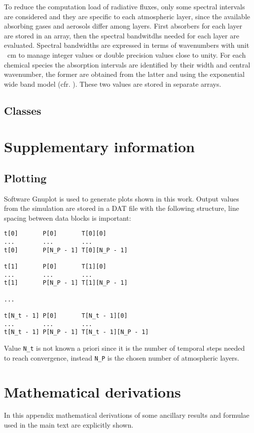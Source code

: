 \documentclass[a4paper,10pt,draft,twocolumn]{article}
\begin{document}
To reduce the computation load of radiative fluxes, only some spectral intervals are considered and they are specific to each atmospheric layer, since the available absorbing gases and aerosols differ among layers. First absorbers for each layer are stored in an array, then the spectral bandwitdhs needed for each layer are evaluated. Spectral bandwidths are expressed in terms of wavenumbers with unit \unit{\per\centi\metre} to manage integer values or double precision values close to unity. For each chemical species the absorption intervals are identified by their width and central wavenumber, the former are obtained from the latter and using the exponential wide band model (cfr. \cite[360]{Modest}). These two values are stored in separate arrays.

\subsection{Classes}

\section{Supplementary information}

\subsection{Plotting}
\label{sec:Plotting}
Software Gnuplot is used to generate plots shown in this work. Output values from the simulation are stored in a DAT file with the following structure, line spacing between data blocks is important:
\begin{verbatim}
t[0]       P[0]       T[0][0]
...        ...        ...
t[0]       P[N_P - 1] T[0][N_P - 1]

t[1]       P[0]       T[1][0]
...        ...        ...
t[1]       P[N_P - 1] T[1][N_P - 1]

...

t[N_t - 1] P[0]       T[N_t - 1][0]
...        ...        ...
t[N_t - 1] P[N_P - 1] T[N_t - 1][N_P - 1]
\end{verbatim}
Value \verb|N_t| is not known a priori since it is the number of temporal steps needed to reach convergence, instead \verb|N_P| is the chosen number of atmospheric layers.

\section{Mathematical derivations}
In this appendix mathematical derivations of some ancillary results and formulae used in the main text are explicitly shown.
\end{document}
